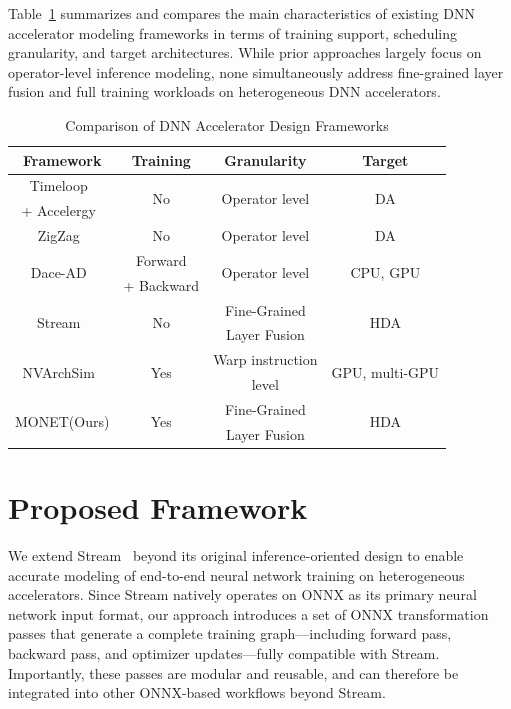 \documentclass[lettersize,journal]{IEEEtran}
\begin{document}
Table~\ref{table:comparisonFrameworks} summarizes and compares the main characteristics of existing DNN accelerator modeling frameworks in terms of training support, scheduling granularity, and target architectures. While prior approaches largely focus on operator-level inference modeling, none simultaneously address fine-grained layer fusion and full training workloads on heterogeneous DNN accelerators.

\begin{table}[b]
\centering
\caption{Comparison of DNN Accelerator Design Frameworks}
\begin{tabular}{|c|c|c|c|} 
\hline
\textbf{Framework}& \textbf{Training}& \textbf{Granularity} & \textbf{Target}\\ 
\hline
Timeloop~\cite{timeloop} & \multirow{2}{*}{No} & \multirow{2}{*}{Operator level} & \multirow{2}{*}{DA}\\ 
+ Accelergy~\cite{accelergy} & & &  \\
\hline
ZigZag~\cite{mei2021ZigZag}& No& Operator level &DA\\ 
\hline
\multirow{2}{*}{Dace-AD~\cite{boudaoud2025dace}} & Forward & \multirow{2}{*}{Operator level}& \multirow{2}{*}{CPU, GPU}\\
 & + Backward &  & \\
\hline
\multirow{2}{*}{Stream~\cite{symons2024stream}} & \multirow{2}{*}{No} & Fine-Grained & \multirow{2}{*}{HDA}\\
 & &  Layer Fusion & \\
\hline
\multirow{2}{*}{NVArchSim~\cite{nvarchsim}} & \multirow{2}{*}{Yes} & Warp instruction  & \multirow{2}{*}{GPU, multi-GPU} \\
 &  & level &  \\
\hline
\multirow{2}{*}{MONET(Ours)} & \multirow{2}{*}{Yes} & Fine-Grained & \multirow{2}{*}{HDA}\\
 & &  Layer Fusion & \\
\hline
\end{tabular}
\label{table:comparisonFrameworks}
\end{table}




\section{Proposed Framework}\label{lb:framework}
We extend Stream~\cite{symons2024stream} beyond its original inference-oriented design to enable accurate modeling of end-to-end neural network training on heterogeneous accelerators. Since Stream natively operates on ONNX as its primary neural network input format, our approach introduces a set of ONNX transformation passes that generate a complete training graph—including forward pass, backward pass, and optimizer updates—fully compatible with Stream. Importantly, these passes are modular and reusable, and can therefore be integrated into other ONNX-based workflows beyond Stream.
\end{document}
